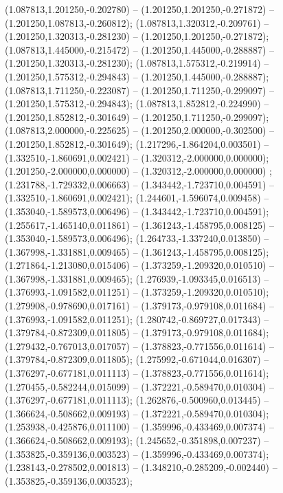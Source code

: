  (1.087813,1.201250,-0.202780) -- (1.201250,1.201250,-0.271872) -- (1.201250,1.087813,-0.260812);
 (1.087813,1.320312,-0.209761) -- (1.201250,1.320313,-0.281230) -- (1.201250,1.201250,-0.271872);
 (1.087813,1.445000,-0.215472) -- (1.201250,1.445000,-0.288887) -- (1.201250,1.320313,-0.281230);
 (1.087813,1.575312,-0.219914) -- (1.201250,1.575312,-0.294843) -- (1.201250,1.445000,-0.288887);
 (1.087813,1.711250,-0.223087) -- (1.201250,1.711250,-0.299097) -- (1.201250,1.575312,-0.294843);
 (1.087813,1.852812,-0.224990) -- (1.201250,1.852812,-0.301649) -- (1.201250,1.711250,-0.299097);
 (1.087813,2.000000,-0.225625) -- (1.201250,2.000000,-0.302500) -- (1.201250,1.852812,-0.301649);
 (1.217296,-1.864204,0.003501) -- (1.332510,-1.860691,0.002421) -- (1.320312,-2.000000,0.000000);
 (1.201250,-2.000000,0.000000) -- (1.320312,-2.000000,0.000000) ;
 (1.231788,-1.729332,0.006663) -- (1.343442,-1.723710,0.004591) -- (1.332510,-1.860691,0.002421);
 (1.244601,-1.596074,0.009458) -- (1.353040,-1.589573,0.006496) -- (1.343442,-1.723710,0.004591);
 (1.255617,-1.465140,0.011861) -- (1.361243,-1.458795,0.008125) -- (1.353040,-1.589573,0.006496);
 (1.264733,-1.337240,0.013850) -- (1.367998,-1.331881,0.009465) -- (1.361243,-1.458795,0.008125);
 (1.271864,-1.213080,0.015406) -- (1.373259,-1.209320,0.010510) -- (1.367998,-1.331881,0.009465);
 (1.276939,-1.093345,0.016513) -- (1.376993,-1.091582,0.011251) -- (1.373259,-1.209320,0.010510);
 (1.279908,-0.978690,0.017161) -- (1.379173,-0.979108,0.011684) -- (1.376993,-1.091582,0.011251);
 (1.280742,-0.869727,0.017343) -- (1.379784,-0.872309,0.011805) -- (1.379173,-0.979108,0.011684);
 (1.279432,-0.767013,0.017057) -- (1.378823,-0.771556,0.011614) -- (1.379784,-0.872309,0.011805);
 (1.275992,-0.671044,0.016307) -- (1.376297,-0.677181,0.011113) -- (1.378823,-0.771556,0.011614);
 (1.270455,-0.582244,0.015099) -- (1.372221,-0.589470,0.010304) -- (1.376297,-0.677181,0.011113);
 (1.262876,-0.500960,0.013445) -- (1.366624,-0.508662,0.009193) -- (1.372221,-0.589470,0.010304);
 (1.253938,-0.425876,0.011100) -- (1.359996,-0.433469,0.007374) -- (1.366624,-0.508662,0.009193);
 (1.245652,-0.351898,0.007237) -- (1.353825,-0.359136,0.003523) -- (1.359996,-0.433469,0.007374);
 (1.238143,-0.278502,0.001813) -- (1.348210,-0.285209,-0.002440) -- (1.353825,-0.359136,0.003523);
